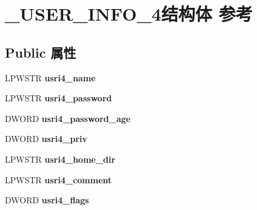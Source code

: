 \hypertarget{struct___u_s_e_r___i_n_f_o__4}{}\section{\+\_\+\+U\+S\+E\+R\+\_\+\+I\+N\+F\+O\+\_\+4结构体 参考}
\label{struct___u_s_e_r___i_n_f_o__4}
\subsection*{Public 属性}
\begin{DoxyCompactItemize}
\item 
\mbox{\label{struct___u_s_e_r___i_n_f_o__4_a82d93389afbcb1c8bab85d5b4acd369c}} 
L\+P\+W\+S\+TR {\bfseries usri4\+\_\+name}
\item 
\mbox{\label{struct___u_s_e_r___i_n_f_o__4_a9b532c1e1865f0cca8274a03151c8380}} 
L\+P\+W\+S\+TR {\bfseries usri4\+\_\+password}
\item 
\mbox{\label{struct___u_s_e_r___i_n_f_o__4_a7812e52d39938745a341c3dceb412014}} 
D\+W\+O\+RD {\bfseries usri4\+\_\+password\+\_\+age}
\item 
\mbox{\label{struct___u_s_e_r___i_n_f_o__4_aea66827a4f170fed27ec9c4123b5a83d}} 
D\+W\+O\+RD {\bfseries usri4\+\_\+priv}
\item 
\mbox{\label{struct___u_s_e_r___i_n_f_o__4_ad4d9b0431c63365991a4ac54a30c08ae}} 
L\+P\+W\+S\+TR {\bfseries usri4\+\_\+home\+\_\+dir}
\item 
\mbox{\label{struct___u_s_e_r___i_n_f_o__4_a22332b06b3a5408dedff9c8dd387ad73}} 
L\+P\+W\+S\+TR {\bfseries usri4\+\_\+comment}
\item 
\mbox{\label{struct___u_s_e_r___i_n_f_o__4_a21528c0d2b70dcdbddf0171b8eb945a2}} 
D\+W\+O\+RD {\bfseries usri4\+\_\+flags}
\item 
\mbox{\label{struct___u_s_e_r___i_n_f_o__4_af6cdc8bc36ab714eb1487e2639fb861f}} 

\end{DoxyCompactItemize}
